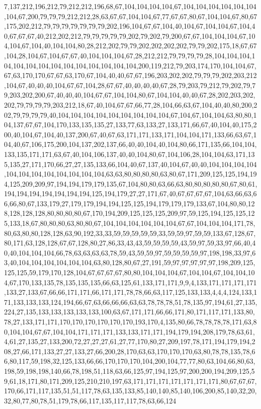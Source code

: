 7,137,212,196,212,79,212,212,196,68,67,104,104,104,104,67,104,104,104,104,104,104,104,67,200,79,79,79,212,212,28,63,67,67,104,104,67,77,67,67,80,67,104,104,67,80,67,175,202,212,79,79,79,79,79,79,79,202,196,104,67,67,104,40,104,67,104,104,67,104,40,67,67,67,40,212,202,212,79,79,79,79,79,202,79,202,79,200,67,67,104,104,104,67,104,104,67,104,40,104,104,80,28,212,202,79,79,202,202,202,202,79,79,202,175,18,67,67,104,28,104,67,104,67,67,40,104,104,104,67,28,212,212,79,79,79,79,28,104,104,104,104,104,104,104,104,104,104,104,104,104,104,200,119,212,79,203,174,170,104,104,67,67,63,170,170,67,67,63,170,67,104,40,40,67,67,196,203,202,202,79,79,79,202,203,212,104,67,40,40,40,104,67,67,104,28,67,67,40,40,40,40,67,28,79,203,79,212,79,202,79,79,203,202,200,67,40,40,40,104,67,67,104,104,80,67,104,104,40,40,67,28,202,203,202,202,79,79,79,79,203,212,18,67,40,104,67,67,66,77,28,104,66,63,67,104,40,40,80,200,202,79,79,79,79,40,104,104,104,104,104,104,104,104,104,67,104,67,104,104,63,80,80,104,137,67,67,104,170,133,135,135,27,133,77,63,133,27,133,171,66,67,40,104,40,175,200,40,104,67,104,40,137,200,67,40,67,63,171,171,133,171,104,104,171,133,66,63,67,104,40,67,106,175,200,104,137,202,137,66,40,40,104,40,104,80,66,171,135,66,104,104,133,135,171,171,63,67,40,104,106,137,40,40,104,80,67,104,106,28,104,104,63,171,135,135,27,171,170,66,27,27,135,133,66,104,40,67,137,40,104,67,40,40,104,104,104,104,104,104,104,104,104,104,104,104,63,63,80,80,80,80,63,80,67,171,209,125,125,194,194,125,209,209,97,194,194,179,179,135,67,104,80,80,63,66,63,80,80,80,80,80,67,80,61,194,194,194,194,194,194,194,125,194,179,27,27,171,67,40,67,67,67,67,104,63,66,63,66,66,80,67,133,179,27,179,179,194,194,125,125,194,179,179,179,133,67,104,80,80,128,128,128,128,80,80,80,80,67,170,194,209,125,125,125,209,97,59,125,194,125,125,125,133,18,67,80,80,80,63,80,80,67,104,104,104,104,104,104,67,67,104,104,104,171,78,80,63,80,80,128,128,63,90,192,33,33,59,59,59,59,59,33,59,59,97,59,59,133,67,128,67,80,171,63,128,128,67,67,128,80,27,86,33,43,43,59,59,59,59,43,59,97,59,33,97,66,40,40,40,104,104,104,66,78,63,63,63,63,78,59,43,59,59,97,59,59,59,59,97,198,198,33,97,63,40,104,104,104,104,104,104,63,80,128,80,67,27,191,59,97,97,97,97,97,198,209,125,125,125,59,179,170,128,104,67,67,67,67,80,80,104,104,104,67,104,104,67,104,104,104,67,170,133,135,78,135,135,135,66,63,125,61,133,171,171,9,9,4,133,171,171,171,171,133,27,133,67,66,66,171,171,66,171,171,78,78,66,63,117,125,133,133,4,4,4,124,133,171,133,133,133,124,194,66,67,63,66,66,66,63,63,78,78,78,51,78,135,97,194,61,27,135,224,27,135,133,133,133,133,133,100,63,67,171,171,66,66,171,80,171,117,171,133,80,78,27,133,171,171,170,170,170,170,170,170,193,170,4,135,80,66,78,78,78,78,171,63,80,104,104,67,67,104,104,171,171,171,133,133,171,171,194,179,194,208,179,78,63,61,4,61,27,135,27,133,200,72,27,27,27,61,27,77,170,80,27,209,197,78,171,194,179,194,208,27,66,171,133,27,27,133,27,66,200,28,170,63,63,170,170,170,63,80,78,78,135,78,66,80,117,59,198,32,125,133,66,66,170,170,170,104,200,104,77,77,80,63,104,66,80,63,198,59,198,198,140,66,78,198,51,118,63,66,125,97,194,125,97,200,200,194,209,125,59,61,18,171,80,171,209,125,210,210,197,63,171,171,171,171,171,171,171,80,67,67,67,170,66,171,117,135,51,51,117,78,63,135,133,85,140,140,85,140,106,200,85,140,32,20,32,80,77,80,78,51,179,78,66,117,135,117,117,78,63,66,124